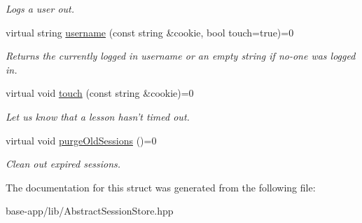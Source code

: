 \begin{DoxyCompactItemize}
\begin{DoxyCompactList}\small\item\em Logs a user out. \item\end{DoxyCompactList}\item 
\hypertarget{structwittyPlus_1_1AbstractSessionStore_a9e28565b6ec8c331a0da480800a73a34}{
virtual string \hyperlink{structwittyPlus_1_1AbstractSessionStore_a9e28565b6ec8c331a0da480800a73a34}{username} (const string \&cookie, bool touch=true)=0}
\label{structwittyPlus_1_1AbstractSessionStore_a9e28565b6ec8c331a0da480800a73a34}

\begin{DoxyCompactList}\small\item\em Returns the currently logged in username or an empty string if no-\/one was logged in. \item\end{DoxyCompactList}\item 
\hypertarget{structwittyPlus_1_1AbstractSessionStore_a02b65c4c27036504daff9e7168885d7c}{
virtual void \hyperlink{structwittyPlus_1_1AbstractSessionStore_a02b65c4c27036504daff9e7168885d7c}{touch} (const string \&cookie)=0}
\label{structwittyPlus_1_1AbstractSessionStore_a02b65c4c27036504daff9e7168885d7c}

\begin{DoxyCompactList}\small\item\em Let us know that a lesson hasn't timed out. \item\end{DoxyCompactList}\item 
\hypertarget{structwittyPlus_1_1AbstractSessionStore_a6cf912b6cba1384a5e5d1c8cf4efa109}{
virtual void \hyperlink{structwittyPlus_1_1AbstractSessionStore_a6cf912b6cba1384a5e5d1c8cf4efa109}{purgeOldSessions} ()=0}
\label{structwittyPlus_1_1AbstractSessionStore_a6cf912b6cba1384a5e5d1c8cf4efa109}

\begin{DoxyCompactList}\small\item\em Clean out expired sessions. \item\end{DoxyCompactList}\end{DoxyCompactItemize}


The documentation for this struct was generated from the following file:\begin{DoxyCompactItemize}
\item 
base-\/app/lib/AbstractSessionStore.hpp\end{DoxyCompactItemize}
